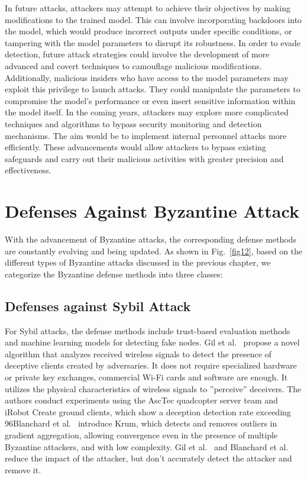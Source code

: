 \documentclass[pdflatex,sn-mathphys-num]{sn-jnl}%
\theoremstyle{thmstyleone}%
\theoremstyle{thmstyletwo}%
\theoremstyle{thmstylethree}%
\begin{document}
In future attacks, attackers may attempt to achieve their
objectives by making modifications to the trained model.
This can involve incorporating backdoors into the model,
which would produce incorrect outputs under specific
conditions, or tampering with the model parameters to
disrupt its robustness. In order to evade detection, future
attack strategies could involve the development of more
advanced and covert techniques to camouflage malicious
modifications. Additionally, malicious insiders who have
access to the model parameters may exploit this privilege
to launch attacks. They could manipulate the parameters
to compromise the model's performance or even insert
sensitive information within the model itself. In the coming
years, attackers may explore more complicated techniques
and algorithms to bypass security monitoring and
detection mechanisms. The aim would be to implement internal
personnel attacks more eﬀiciently. These advancements
would allow attackers to bypass existing safeguards and
carry out their malicious activities with greater precision
and effectiveness.

\section{Defenses Against Byzantine Attack}
With the advancement of Byzantine attacks, the
corresponding defense methods are constantly evolving and
being updated. As shown in Fig.~\ref{fig12}, based on the different
types of Byzantine attacks discussed in the previous
chapter, we categorize the Byzantine defense methods into
three classes:

\subsection{Defenses against Sybil Attack}
For Sybil attacks, the defense methods include trust-based
evaluation methods and machine learning models
for detecting fake nodes. Gil et al.~\cite{gil2017guaranteeing} propose a novel
algorithm that analyzes received wireless signals to detect
the presence of deceptive clients created by adversaries.
It does not require specialized hardware or private key
exchanges, commercial Wi-Fi cards and software are
enough. It utilizes the physical characteristics of wireless
signals to ”perceive” deceivers. The authors conduct
experiments using the AscTec quadcopter server team and
iRobot Create ground clients, which show a deception
detection rate exceeding 96Blanchard et al.~\cite{blanchard2017machine} introduce
Krum, which detects and removes outliers in gradient
aggregation, allowing convergence even in the presence
of multiple Byzantine attackers, and with low complexity.
Gil et al.~\cite{gil2017guaranteeing} and Blanchard et al.~\cite{blanchard2017machine} reduce the impact
of the attacker, but don't accurately detect the attacker
and remove it.
\end{document}
